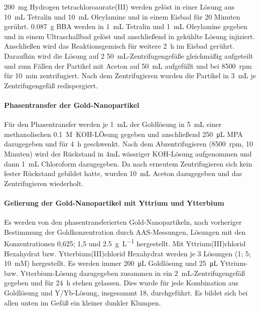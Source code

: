 		\SI{200}{\milli\gram} Hydrogen tetrachloroaurate(III) werden gelöst in einer Lösung aus \SI{10}{\milli\liter} Tetralin und \SI{10}{\milli\liter} Oleylamine und in einem Eisbad für 20 Minuten gerührt.
		\SI{0,087}{\gram} BBA werden in \SI{1}{\milli\liter} Tetralin und \SI{1}{\milli\liter} Oleylamine gegeben und in einem Ultraschallbad gelöst und anschließend in gekühlte Lösung injiziert.
		Anschließen wird das Reaktionsgemisch für weitere \SI{2}{\hour} im Eisbad gerührt.
		Daraufhin wird die Lösung auf 2 \SI{50}{\milli\liter}-Zentrifugengefäße gleichmäßig aufgeteilt und zum Fällen der Partikel mit Aceton auf \SI{50}{\milli\liter} aufgefüllt und bei 8500~rpm für \SI{10}{\minute} zentrifugiert.
		Nach dem Zentrifugieren wurden die Partikel in \SI{3}{\milli\liter} je Zentrifugengefäß redispergiert.
		
		\paragraph{Phasentransfer der Gold-Nanopartikel}
		
		Für den Phasentransfer werden je \SI{1}{\milli\liter} der Goldlösung in \SI{5}{\milli\liter} einer methanolischen \SI{0,1}{M}~KOH-LÖsung gegeben und anschließend \SI{250}{\micro\liter} MPA dazugegeben und für \SI{4}{\hour} geschwenkt.
		Nach dem Abzentrifugieren (8500~rpm, 10 Minuten) wird der Rückstand in 4mL wässriger KOH-Lösung aufgenommen und dann \SI{1}{\milli\liter} Chloroform dazugegeben. 
		Da nach erneutem Zentrifugieren sich kein fester Rückstand gebildet hatte, wurden \SI{10}{\milli\liter} Aceton dazugegeben und das Zentrifugieren wiederholt.
		
		\paragraph{Gelierung der Gold-Nanopartikel mit Yttrium und Ytterbium}
		
		Es werden von den phasentransferierten Gold-Nanopartikeln, nach vorheriger Bestimmung der Goldkonzentration durch AAS-Messungen, Lösungen mit den Konzentrationen 0,625; 1,5 und \SI{2,5}{\gram\per\liter} hergestellt.
		Mit Yttrium(III)chlorid Hexahydrat bzw. Ytterbium(III)chlorid Hexahydrat werden je 3 Lösungen (1; 5; \SI{10}{mM}) hergestellt.
		Es werden immer \SI{200}{\micro\liter} Goldlösung und \SI{25}{\micro\liter} Yttrium- bzw. Ytterbium-Lösung dazugegeben zusammen in ein \SI{2}{\milli\liter}-Zentrifugengefäß gegeben und für \SI{24}{\hour} stehen gelassen.
		Dies wurde für jede Kombination aus Goldlösung und Y/Yb-Lösung, insgesammt 18, durchgeführt.
		Es bildet sich bei allen unten im Gefäß ein kleiner dunkler Klumpen.
		  
